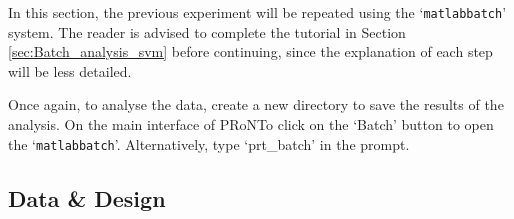 In this section, the previous experiment will be repeated using the `\texttt{matlabbatch}' system. The reader is advised to complete the tutorial in Section \ref{sec:Batch_analysis_svm} before continuing, since the explanation of each step will be less detailed.

Once again, to analyse the data, create a new directory to save the results of the analysis. On the main interface of PRoNTo click on the `Batch' button to open the `{\tt matlabbatch}'. Alternatively, type `prt\_batch' in the \matlab{}  prompt.


\subsection{Data \& Design}

